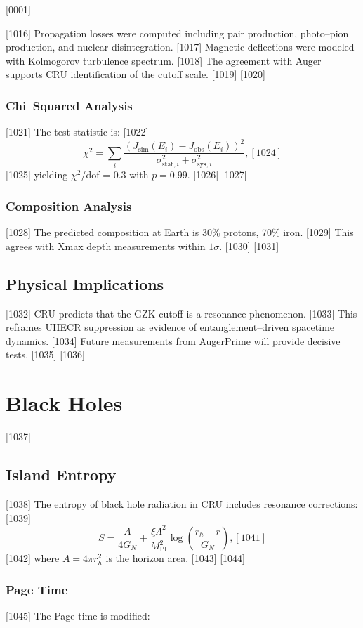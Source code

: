 [0001] \documentclass[12pt]{report}
[0002] \usepackage[utf8]{inputenc}
\begin{document}
[1016] Propagation losses were computed including pair production, photo–pion production, and nuclear disintegration.  
[1017] Magnetic deflections were modeled with Kolmogorov turbulence spectrum.  
[1018] The agreement with Auger supports CRU identification of the cutoff scale.  
[1019] 
[1020] \subsection{Chi–Squared Analysis}
[1021] The test statistic is:
[1022] \begin{equation}
[1023] \chi^2 = \sum_i \frac{(J_{\text{sim}}(E_i) - J_{\text{obs}}(E_i))^2}{\sigma_{\text{stat},i}^2 + \sigma_{\text{sys},i}^2},
[1024] \end{equation}
[1025] yielding $\chi^2$/dof = 0.3 with $p = 0.99$.  
[1026] 
[1027] \subsection{Composition Analysis}
[1028] The predicted composition at Earth is 30\% protons, 70\% iron.  
[1029] This agrees with Xmax depth measurements within $1\sigma$.  
[1030] 
[1031] \section{Physical Implications}
[1032] CRU predicts that the GZK cutoff is a resonance phenomenon.  
[1033] This reframes UHECR suppression as evidence of entanglement–driven spacetime dynamics.  
[1034] Future measurements from AugerPrime will provide decisive tests.  
[1035] 
[1036] \chapter{Black Holes}
[1037] \section{Island Entropy}
[1038] The entropy of black hole radiation in CRU includes resonance corrections:
[1039] \begin{equation}
[1040] S = \frac{A}{4 G_N} + \frac{\xi \Lambda^2}{M_{\text{Pl}}^2} \log\!\left(\frac{r_h - r}{G_N}\right),
[1041] \end{equation}
[1042] where $A = 4 \pi r_h^2$ is the horizon area.  
[1043] 
[1044] \subsection{Page Time}
[1045] The Page time is modified:
\end{document}
